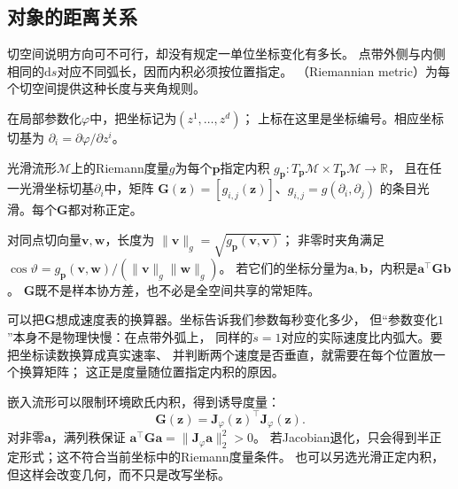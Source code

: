 \subsection{对象的距离关系}
\label{sec:geometry-metric-length-distance}
\label{sec:geometry-metric-path-geodesic}
\label{sec:geometry-same-point-metric}

\label{sec:geometry-riemannian-metric}
\label{sec:geometry-path-speed-length}
\label{sec:geometry-endpoint-distance}
\label{sec:geometry-continuous-geodesic-distance}

切空间说明方向可不可行，却没有规定一单位坐标变化有多长。
点带外侧与内侧相同的$\mathrm ds$对应不同弧长，因而内积必须按位置指定。
（Riemannian metric）为每个切空间提供这种长度与夹角规则。

在局部参数化$\varphi$中，把坐标记为$(z^1,\ldots,z^d)$；
上标在这里是坐标编号。相应坐标切基为
$\partial_i=\partial\varphi/\partial z^i$。

\begin{definition}[Riemann度量]
\label{def:geometry-riemannian-metric}
光滑流形$\mathcal M$上的Riemann度量$g$为每个$\bm p$指定内积
$g_{\bm p}:T_{\bm p}\mathcal M\times T_{\bm p}\mathcal M\to\mathbb R$，
且在任一光滑坐标切基$\partial_i$中，矩阵
$\bm G(\bm z)=[g_{i,j}(\bm z)]$、$g_{i,j}=g(\partial_i,\partial_j)$
的条目光滑。每个$\bm G$都对称正定。
\end{definition}
对同点切向量$\bm v,\bm w$，长度为
$\lVert\bm v\rVert_g=\sqrt{g_{\bm p}(\bm v,\bm v)}$；
非零时夹角满足
$\cos\vartheta=g_{\bm p}(\bm v,\bm w)/
(\lVert\bm v\rVert_g\lVert\bm w\rVert_g)$。
若它们的坐标分量为$\bm a,\bm b$，内积是$\bm a^\top\bm G\bm b$。
$\bm G$既不是样本协方差，也不必是全空间共享的常矩阵。

可以把$\bm G$想成速度表的换算器。坐标告诉我们参数每秒变化多少，
但“参数变化$1$”本身不是物理快慢：在点带外弧上，
同样的$\dot s=1$对应的实际速度比内弧大。要把坐标读数换算成真实速率、
并判断两个速度是否垂直，就需要在每个位置放一个换算矩阵；
这正是度量随位置指定内积的原因。

嵌入流形可以限制环境欧氏内积，得到诱导度量：
\begin{equation}
 \bm G(\bm z)=\bm J_\varphi(\bm z)^\top\bm J_\varphi(\bm z).
 \label{eq:geometry-induced-metric}
\end{equation}
对非零$\bm a$，满列秩保证
$\bm a^\top\bm G\bm a=\lVert\bm J_\varphi\bm a\rVert_2^2>0$。
若Jacobian退化，只会得到半正定形式；这不符合当前坐标中的Riemann度量条件。
也可以另选光滑正定内积，但这样会改变几何，而不只是改写坐标。

